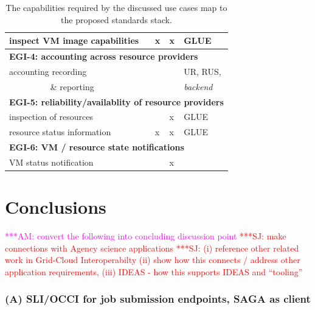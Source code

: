 \documentclass[10pt,conference,final,letterpaper,twoside,twocolumn,]{IEEEtran}
\newcommand{\amnote}[1]{  {\textcolor{magenta} {***AM: #1}}}
\newcommand{\jhanote}[1]{ {\textcolor{red}     {***SJ: #1}}}
\newcommand{\amnote}[1]{}
\newcommand{\jhanote}[1]{}
\newcommand{\I}[1]{\textit{#1}}
\newcommand{\B}[1]{\textbf{#1}}
\newcommand{\F}[1]{\B{[FIXME: #1]}}
\begin{document}
\begin{table}[thb]
\begin{tabular}{|p{37mm}|p{10mm}|p{10mm}|p{15mm}|}
   inspect VM image capabilities   & x                     & x                     & GLUE       \\\hline
   \multicolumn{4}{|l|}{\B{EGI-4: accounting across resource providers}}                        \\
   accounting recording            &                       &                       & UR, RUS,   \\
   ~~~~~~~~~ \& reporting          &                       &                       & \I{backend}\\\hline
   \multicolumn{4}{|l|}{\B{EGI-5: reliability/availablity of resource providers}}               \\
   inspection of resources         &                       & x                     & GLUE       \\
   resource status information     & x                     & x                     & GLUE       \\\hline
   \multicolumn{4}{|l|}{\B{EGI-6: VM / resource state notifications}}                           \\
   VM status notification          &                       & x                     &            \\\hline
  \end{tabular}
  \caption{\footnotesize\label{table:capabilities}The capabilities required by the 
  discussed use cases map to the proposed standards stack.}
 \end{table}


\section{Conclusions}




\amnote{convert the following into concluding discussion point}
\jhanote{make connections with Agency science applications}
\jhanote{(i) reference other related work in Grid-Cloud
Interoperabilty (ii) show how this connects / address other
application requirements, (iii) IDEAS - how this supports IDEAS and
``tooling''}

 \subsubsection*{(A) SLI/OCCI for job submission endpoints, SAGA as client}
\end{document}
